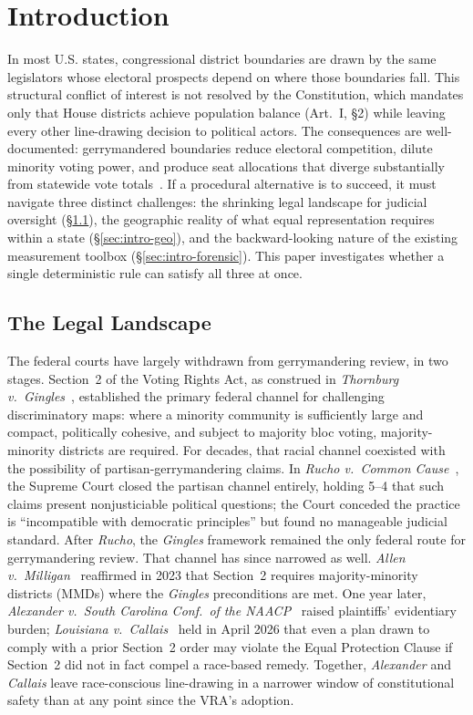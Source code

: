 ﻿\section{Introduction}

In most U.S. states, congressional district boundaries are drawn by
the same legislators whose electoral prospects depend on where those
boundaries fall. This structural conflict of interest is not resolved
by the Constitution, which mandates only that House districts achieve
population balance (Art.~I, \S2) while leaving every other
line-drawing decision to political actors. The consequences are
well-documented: gerrymandered boundaries reduce electoral
competition, dilute minority voting power, and produce seat
allocations that diverge substantially from statewide vote
totals~\cite{stephanopoulosmcghee2015,chenrodden2013}. If a
procedural alternative is to succeed, it must navigate three distinct
challenges: the shrinking legal landscape for judicial oversight
(\S\ref{sec:intro-legal}), the geographic reality of what equal
representation requires within a state (\S\ref{sec:intro-geo}), and
the backward-looking nature of the existing measurement toolbox
(\S\ref{sec:intro-forensic}). This paper investigates whether a
single deterministic rule can satisfy all three at once.

\subsection{The Legal Landscape}
\label{sec:intro-legal}

The federal courts have largely withdrawn from gerrymandering review,
in two stages. Section~2 of the Voting Rights Act, as construed in
\textit{Thornburg v.~Gingles}~\cite{gingles1986}, established the
primary federal channel for challenging discriminatory maps: where a
minority community is sufficiently large and compact, politically
cohesive, and subject to majority bloc voting, majority-minority
districts are required. For decades, that racial channel coexisted
with the possibility of partisan-gerrymandering claims. In
\textit{Rucho v.~Common Cause}~\cite{rucho2019}, the Supreme Court
closed the partisan channel entirely, holding 5--4 that such claims
present nonjusticiable political questions; the Court conceded the
practice is ``incompatible with democratic principles'' but found no
manageable judicial standard. After \textit{Rucho}, the \textit{Gingles}
framework remained the only federal route for gerrymandering review.
That channel has since narrowed as well. \textit{Allen
v.~Milligan}~\cite{milligan2023} reaffirmed in 2023 that Section~2
requires majority-minority districts (MMDs) where the \textit{Gingles}
preconditions are met. One year later, \textit{Alexander
v.~South Carolina Conf.~of the NAACP}~\cite{alexander2024} raised
plaintiffs' evidentiary burden; \textit{Louisiana
v.~Callais}~\cite{callais2026} held in April 2026 that even a plan
drawn to comply with a prior Section~2 order may violate the Equal
Protection Clause if Section~2 did not in fact compel a race-based
remedy. Together, \textit{Alexander} and \textit{Callais} leave
race-conscious line-drawing in a narrower window of constitutional
safety than at any point since the VRA's adoption.

